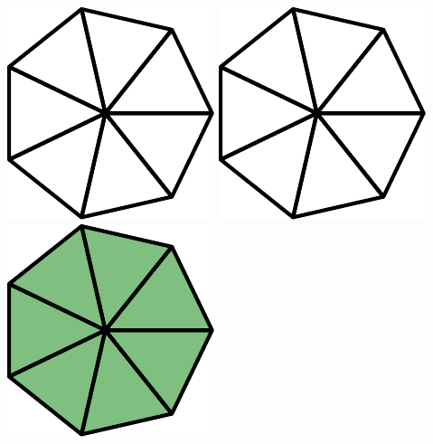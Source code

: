 \begin{center}
	\includegraphics[]{brokintro7a}\quad
	\includegraphics[]{brokintro7a}\quad
	\includegraphics[]{brokintro7b}
\end{center}
\vspace{20pt}
